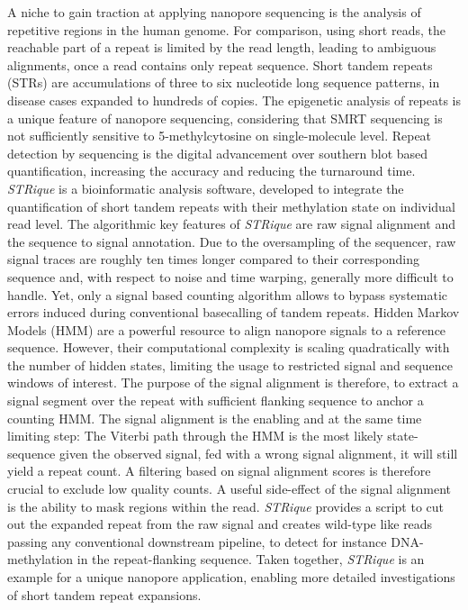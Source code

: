A niche to gain traction at applying nanopore sequencing is the analysis of repetitive regions in the human genome.
For comparison, using short reads, the reachable part of a repeat is limited by the read length, leading to ambiguous alignments, once a read contains only repeat sequence.
Short tandem repeats (STRs) are accumulations of three to six nucleotide long sequence patterns, in disease cases expanded to hundreds of copies.
The epigenetic analysis of repeats is a unique feature of nanopore sequencing, considering that SMRT sequencing is not sufficiently sensitive to 5-methylcytosine on single-molecule level.
Repeat detection by sequencing is the digital advancement over southern blot based quantification, increasing the accuracy and reducing the turnaround time.
\textit{STRique} is a bioinformatic analysis software, developed to integrate the quantification of short tandem repeats with their methylation state on individual read level.
The algorithmic key features of \textit{STRique} are raw signal alignment and the sequence to signal annotation.
Due to the oversampling of the sequencer, raw signal traces are roughly ten times longer compared to their corresponding sequence and, with respect to noise and time warping, generally more difficult to handle.
Yet, only a signal based counting algorithm allows to bypass systematic errors induced during conventional basecalling of tandem repeats.
Hidden Markov Models (HMM) are a powerful resource to align nanopore signals to a reference sequence.
However, their computational complexity is scaling quadratically with the number of hidden states, limiting the usage to restricted signal and sequence windows of interest.
The purpose of the signal alignment is therefore, to extract a signal segment over the repeat with sufficient flanking sequence to anchor a counting HMM.
The signal alignment is the enabling and at the same time limiting step: The Viterbi path through the HMM is the most likely state-sequence given the observed signal, fed with a wrong signal alignment, it will still yield a repeat count.
A filtering based on signal alignment scores is therefore crucial to exclude low quality counts.
A useful side-effect of the signal alignment is the ability to mask regions within the read.
\textit{STRique} provides a script to cut out the expanded repeat from the raw signal and creates wild-type like reads passing any conventional downstream pipeline, to detect for instance DNA-methylation in the repeat-flanking sequence.
Taken together, \textit{STRique} is an example for a unique nanopore application, enabling more detailed investigations of short tandem repeat expansions.



